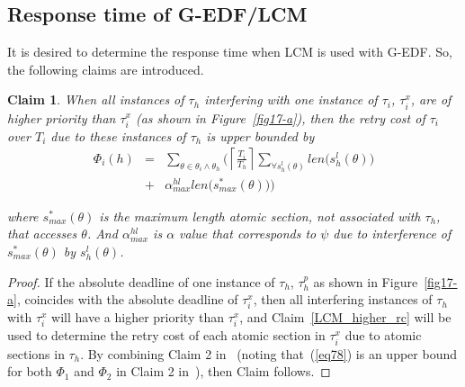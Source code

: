 \documentclass[conference]{IEEEtran}
\newtheorem{clm}{Claim}
\begin{document}
\subsection{\label{response g-edf/lcm} Response time of G-EDF/LCM}

It is desired to determine the response time when LCM is used with G-EDF. So, the following claims are introduced.

\begin{clm}\label{GEDF/LCM response time}
When all instances of $\tau_h$ interfering with one instance of $\tau_i$, $\tau_i^x$, are of higher priority than $\tau_i^x$ (as shown in Figure~\ref{fig17-a}), then the retry cost of $\tau_i$ over $T_i$ due to these instances of $\tau_h$ is upper bounded by
\begin{eqnarray}
\Phi_i(h) & = & \sum_{\theta \in \theta_i \wedge \theta_h}\Bigg(\left\lceil\frac{T_{i}}{T_{h}}\right\rceil\sum_{\forall s_{h}^{l}(\theta)}len\Big(s_{h}^{l}(\theta)\Big)\nonumber\\
& + & \alpha_{max}^{hl}len\Big(s_{max}^{*}(\theta)\Big)\Bigg)
\label{eq78}\end{eqnarray} 

where $s_{max}^* (\theta)$ is the maximum length atomic section, not associated with $\tau_h$, that accesses $\theta$. And  $\alpha_{max}^{hl}$ is $\alpha$ value that corresponds to $\psi$ due to interference of $s_{max}^*(\theta)$ by $s_h^l(\theta)$.
\end{clm}

\begin{proof}
If the absolute deadline of one instance of $\tau_h$, $\tau_h^p$ as shown in Figure~\ref{fig17-a}, coincides with the absolute deadline of $\tau_i^x$, then all interfering instances of $\tau_h$ with $\tau_i^x$ will have a higher priority than $\tau_i^x$, and Claim~\ref{LCM_higher_rc} will be used to determine the retry cost of each atomic section in $\tau_i^x$ due to atomic sections in $\tau_h$. By combining Claim 2 in~\cite{stmconcurrencycontrol:emsoft11} (noting that~(\ref{eq78}) is an upper bound for both $\Phi_1$ and $\Phi_2$ in Claim 2 in~\cite{stmconcurrencycontrol:emsoft11}), then Claim follows.
\end{proof}
\end{document}
